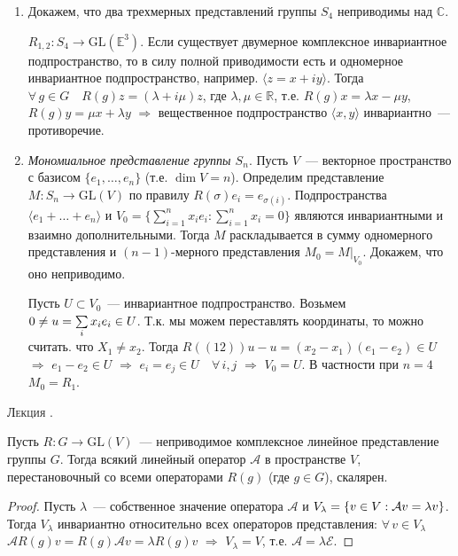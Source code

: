 \documentclass[a4paper]{article}
\newcounter{lec}
\renewcommand{\thelec}{\Roman{lec}}
\newcommand*{\lecture}[1]{\refstepcounter{lec}\vspace{20pt}
\begin{center}{\rmfamily\textsc{Лекция \thelec. \\ \textbf{#1}}}\vspace{5pt}
\end{center}}
\newcommand*{\p}[1]{#1\nobreak\discretionary{}{\hbox{$\mathsurround=0pt #1$}}{}}
\begin{document}
\begin{ex}
\begin{enumerate}
  \item Докажем, что два трехмерных представлений группы $S_4$
  неприводимы над $\mathbb{C}$.

  $R_{1,2}\colon S_4\to \mathrm{GL}(\mathbb{E}^3)$. Если существует двумерное
  комплексное инвариантное подпространство, то в силу полной
  приводимости есть и одномерное инвариантное подпространство,
  например. $\langle z=x+iy\rangle$. Тогда $\forall \, g\in G\quad
  R(g)z=(\lambda+i\mu)z$, где $\lambda,\mu\in \mathbb{R}$, т.е. $R(g)x=\lambda x-\mu
  y$, $R(g)y=\mu x+\lambda y$ $\Rightarrow$ вещественное
  подпространство $\langle x,y\rangle$ инвариантно~--- противоречие.
  \item \emph{Мономиальное представление группы $S_n$}. Пусть
  $V$~--- векторное пространство с базисом $\{e_1,\ldots,e_n\}$ (т.е. $\dim V=n$).
  Определим представление $M\colon S_n\to \mathrm{GL}(V)$ по правилу
  $R(\sigma)e_i=e_{\sigma(i)}$. Подпространства $\langle
  e_1+\ldots+e_n\rangle$ и $V_0=\Big\{\sum\limits_{i=1}^n x_ie_i: \sum\limits_{i=1}^n
  x_i=0\Big\}$ являются инвариантными и взаимно дополнительными.
  Тогда $M$ раскладывается в сумму одномерного представления и
  $(n-1)$-мерного представления $M_0=M|_{V_0}$. Докажем, что оно
  неприводимо.

  Пусть $U\subset V_0$~--- инвариантное подпространство. Возьмем $0\neq u\p=\sum\limits_i x_ie_i\in
  U$. Т.к. мы можем переставлять координаты, то можно считать. что
  $X_1\neq x_2$. Тогда $R((12))u-u=(x_2-x_1)(e_1-e_2)\in U$
  $\Rightarrow$ $e_1-e_2\in U$ $\Rightarrow$ $e_i=e_j\in U\quad \forall \,
  i,j$ $\Rightarrow$ $V_0=U$. В частности при $n=4$ $M_0=R_1$.
\end{enumerate}
\end{ex}
\lecture{}

\begin{theorem}
Пусть $R\colon G\to \mathrm{GL}(V)$~--- неприводимое комплексное
линейное представление группы $G$. Тогда всякий линейный оператор
$\mathcal{A}$ в пространстве $V$, перестановочный со всеми
операторами $R(g)$ (где $g\in G$), скалярен.
\end{theorem}

\begin{proof}
Пусть $\lambda$~--- собственное значение оператора $\mathcal{A}$ и
$V_\lambda\p=\{v\in V: \mathcal{A}v=\lambda v\}$. Тогда $V_\lambda$
инвариантно относительно всех операторов представления: $\forall \,
v\in V_\lambda$ \quad $\mathcal{A}R(g)v=R(g)\mathcal{A}v=\lambda
R(g)v$ $\Rightarrow$ $V_\lambda=V$, т.е.
$\mathcal{A}=\lambda\mathcal{E}$.
\end{proof}
\end{document}
